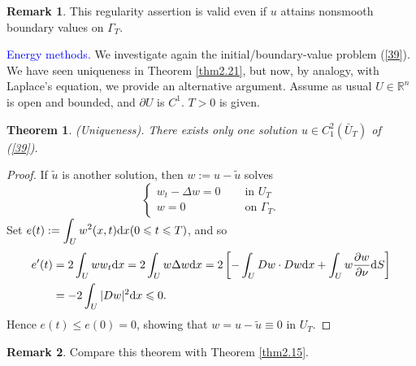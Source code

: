 \documentclass[hyperref,UTF8,12pt]{article}
\numberwithin{equation}{subsection}
\theoremstyle{plain}
\newtheorem{theorem}{Theorem}
\theoremstyle{definition}
\newtheorem{remark}{Remark}
\numberwithin{theorem}{section}
\numberwithin{lemma}{section}
\numberwithin{proposition}{section}
\numberwithin{remark}{section}
\numberwithin{corollary}{section}
\numberwithin{definition}{section}
\numberwithin{problem}{section}
\numberwithin{example}{section}
\def\dif{\textup{d}}
\newcommand{\dis}{\displaystyle}
\newcommand{\ptl}{\partial}
\newcommand{\mr}{\mathbb{R}}
\renewcommand{\leq}{\leqslant}
\begin{document}
\begin{remark}
This regularity assertion is valid even if $u$ attains nonsmooth boundary values on $\Gamma_T$.
\end{remark}

\noindent\textcolor{blue}{Energy methods.} We investigate again the initial/boundary-value problem (\ref{39}). We have seen uniqueness in Theorem \ref{thm2.21}, but now, by analogy, with Laplace's equation, we provide an alternative argument. Assume as usual $U\in\mr^n$ is open and bounded, and $\ptl U$ is $C^1$. $T>0$ is given.
\begin{theorem}
(Uniqueness). There exists only one solution $u\in C_1^2(\bar{U}_T)$ of (\ref{39}).
\end{theorem}
\begin{proof}
If $\tilde{u}$ is another solution, then $w:=u-\tilde{u}$ solves\[\left\{\begin{aligned}
	w_t-\Delta w=0&\quad\text{ in } U_T \\
	w=0&\quad\text{ on } \Gamma_T .
\end{aligned}\right.\]Set $e(t):=\dis\int_Uw^2(x,t)\dif x(0\leq t\leq T)$, and so
\[\begin{aligned}
	e^\prime(t)&=2\int_Uww_t\dif x=2\int_Uw\Delta w\dif x=2\left[-\int_UDw\cdot Dw\dif x+\int_Uw\frac{\ptl w}{\ptl\nu}\dif S\right]\\
	&=-2\int_U|Dw|^2\dif x\leq0.
\end{aligned}\]Hence $e(t)\leq e(0)=0$, showing that $w=u-\tilde{u}\equiv0$ in $U_T$.
\end{proof}
\begin{remark}
Compare this theorem with Theorem \ref{thm2.15}.
\end{remark}
\end{document}
